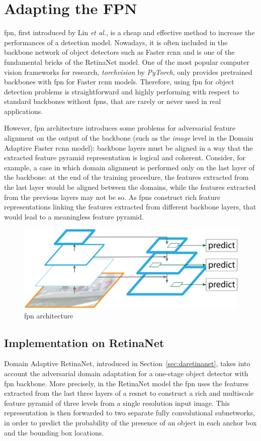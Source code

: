 \documentclass[%
    corpo=12pt,
    twoside,
    stile=classica,   
    tipotesi=magistrale,
    evenboxes,
    english,
	numerazioneromana,
]{toptesi}
\begin{document}
\section{Adapting the FPN}
\acrfull{fpn}, first introduced by Lin \textit{et al.}\cite{lin2017feature}, is a cheap and effective method to increase the performances of a detection model. Nowadays, it is often included in the backbone network of object detectors such as Faster \gls{rcnn} and is one of the fundamental bricks of the RetinaNet model. One of the most popular computer vision frameworks for research, \textit{torchvision} by \textit{PyTorch}\cite{paszke2019pytorch}, only provides pretrained backbones with \gls{fpn} for Faster \gls{rcnn} models. Therefore, using \gls{fpn} for object detection problems is straightforward and highly performing with respect to standard backbones without \glspl{fpn}, that are rarely or never used in real applications.

However, \gls{fpn} architecture introduces some problems for adversarial feature alignment on the output of the backbone (such as the \textit{image} level in the Domain Adaptive Faster \gls{rcnn} model): backbone layers must be aligned in a way that the extracted feature pyramid representation is logical and coherent. Consider, for example, a case in which domain alignment is performed only on the last layer of the backbone: at the end of the training procedure, the features extracted from the last layer would be aligned between the domains, while the features extracted from the previous layers may not be so. As \glspl{fpn} construct rich feature representations linking the features extracted from different backbone layers, that would lead to a meaningless feature pyramid.

\begin{figure}[ht]
	\centering
	\includegraphics[width=.6\linewidth]{imgs/fpn.png}
	\caption{\Gls{fpn} architecture\cite{chen2018domain}}
	\label{fig:fpn}
\end{figure}

\subsection{Implementation on RetinaNet}
Domain Adaptive RetinaNet, introduced in Section~\ref{sec:daretinanet}, takes into account the adversarial domain adaptation for a one-stage object detector with \gls{fpn} backbone. More precisely, in the RetinaNet model the \gls{fpn} uses the features extracted from the last three layers of a \gls{resnet} to construct a rich and multiscale feature pyramid of three levels from a single resolution input image. This representation is then forwarded to two separate fully convolutional subnetworks, in order to predict the probability of the presence of an object in each anchor box and the bounding box locations.
\end{document}
